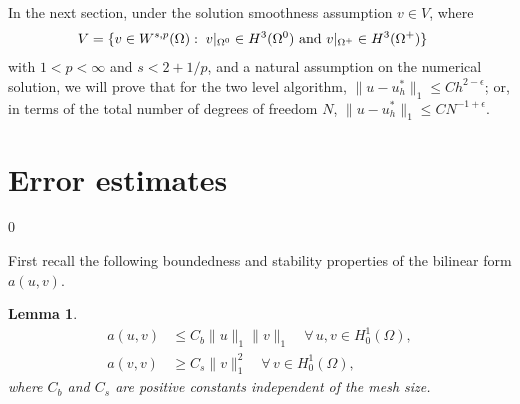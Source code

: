 \documentclass[12pt]{article}
\newtheorem{lemma}[theorem]{Lemma}
\begin{document}
In the next section, under the solution smoothness assumption $v\in V$, where  
\begin{align}
V&=\{v\in W^{s,p}(\Omega):\; v|_{\Omega^0}\in H^3(\Omega^0)
 \ {\rm and}\ v|_{\Omega^+}\in H^3(\Omega^+)\}\label{regularity}
\end{align}
with $1<p<\infty$ and $s<2+1/p$, and a natural assumption on the numerical solution, we will prove 
that for the two level algorithm, $\|u-u^*_h\|_1\leq C h^{2-\epsilon}$; or, in terms
of the total number of degrees of freedom $N$, $\|u-u^*_h\|_1\leq C N^{-1+\epsilon}$.

\section{Error estimates}\label{sec:est}
\setcounter{equation}0

First recall the following boundedness and stability properties of the bilinear form $a(u,v)$.

\begin{lemma}
\begin{align}\label{bound}
a(u,v)&\leq C_b  \|u\|_1\| v\|_1\quad\forall\, u,v \in H^1_0(\Omega),\\
a(v,v)&\geq C_s \|v\|_1^2 \quad \forall\, v \in H^1_0(\Omega),
\label{stable}
\end{align}
where $C_b$ and $C_s$ are positive constants independent of the mesh size.
\end{lemma}
\end{document}
